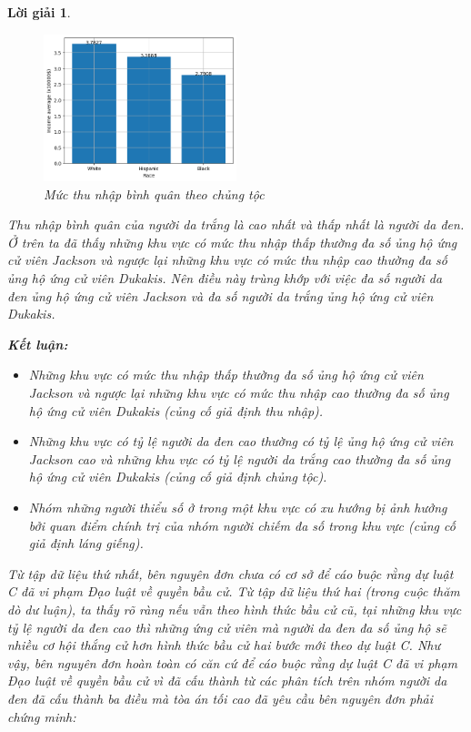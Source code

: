 \documentclass[14pt, a4paper]{article}
\theoremstyle{sltheorem}
\theoremstyle{soltheorem}
\newtheorem*{loigiai}{Lời giải}
\begin{document}
\begin{loigiai}
\begin{enumerate}
    \begin{figure}[H]
        \centering
        \includegraphics[width=0.5\textwidth]{figures/race_group_income_average.png}
        \caption{Mức thu nhập bình quân theo chủng tộc}
        \label{fig:race_group_income_average}
    \end{figure}

    Thu nhập bình quân của người da trắng là cao nhất và thấp nhất là người da đen.
    Ở trên ta đã thấy những khu vực có mức thu nhập thấp thường đa số ủng hộ ứng cử viên Jackson và ngược lại những khu vực có mức thu nhập cao thường đa số ủng hộ ứng cử viên Dukakis.
    Nên điều này trùng khớp với việc đa số người da đen ủng hộ ứng cử viên Jackson và đa số người da trắng ủng hộ ứng cử viên Dukakis.

    \textbf{Kết luận:}

    \begin{itemize}
        \item Những khu vực có mức thu nhập thấp thường đa số ủng hộ ứng cử viên Jackson và ngược lại những khu vực có mức thu nhập cao thường đa số ủng hộ ứng cử viên Dukakis (củng cố giả định thu nhập).
        \item Những khu vực có tỷ lệ người da đen cao thường có tỷ lệ ủng hộ ứng cử viên Jackson cao và những khu vực có tỷ lệ người da trắng cao thường đa số ủng hộ ứng cử viên Dukakis (củng cố giả định chủng tộc).
        \item Nhóm những người thiểu số ở trong một khu vực có xu hướng bị ảnh hưởng bởi quan điểm chính trị của nhóm người chiếm đa số trong khu vực (củng cố giả định láng giếng).
    \end{itemize}

    Từ tập dữ liệu thứ nhất, bên nguyên đơn chưa có cơ sở để cáo buộc rằng dự luật C đã vi phạm Đạo luật về quyền bầu cử.
    Từ tập dữ liệu thứ hai (trong cuộc thăm dò dư luận), ta thấy rõ ràng nếu vẫn theo hình thức bầu cử cũ, tại những khu vực tỷ lệ người da đen cao thì những ứng cử viên mà người da đen đa số ủng hộ sẽ nhiều cơ hội thắng cử hơn hình thức bầu cử hai bước mới theo dự luật C.
    Như vậy, bên nguyên đơn hoàn toàn có căn cứ để cáo buộc rằng dự luật C đã vi phạm Đạo luật về quyền bầu cử vì đã cấu thành từ các phân tích trên nhóm người da đen đã cấu thành ba điều mà tòa án tối cao đã yêu cầu bên nguyên đơn phải chứng minh:


\end{enumerate}
\end{loigiai}
\end{document}
